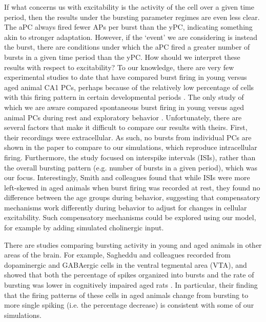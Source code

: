 \documentclass[10pt,letterpaper]{article}
\begin{document}
 If what concerns us with excitability is the activity of the cell over a given time period, then the results under the bursting parameter regimes are even less clear. The aPC always fired fewer APs per burst than the yPC, indicating something akin to stronger adaptation. However, if the `event' we are considering is instead the burst, there are conditions under which the aPC fired a greater number of bursts in a given time period than the yPC. How should we interpret these results with respect to excitability? To our knowledge, there are very few experimental studies to date that have compared burst firing in young versus aged animal CA1 PCs, perhaps because of the relatively low percentage of cells with this firing pattern in certain developmental periods \cite{chen2005transitional}. The only study of which we are aware compared spontaneous burst firing in young versus aged animal PCs during rest and exploratory behavior \cite{smith2000effect}. Unfortunately, there are several factors that make it difficult to compare our results with theirs. First, their recordings were extracellular. As such, no bursts from individual PCs are shown in the paper to compare to our simulations, which reproduce intracellular firing. Furthermore, the study focused on interspike intervals (ISIs), rather than the overall bursting pattern (e.g. number of bursts in a given period), which was our focus. Interestingly, Smith and colleagues \cite{smith2000effect} found that while ISIs were more left-skewed in aged animals when burst firing was recorded at rest, they found no difference between the age groups during behavior, suggesting that compensatory mechanisms work differently during behavior to adjust for changes in cellular excitability. Such compensatory mechanisms could be explored using our model, for example by adding simulated cholinergic input. 
 
There are studies comparing bursting activity in young and aged animals in other areas of the brain. For example, Sagheddu and colleagues recorded from dopaminergic and GABAergic cells in the ventral tegmental area (VTA), and showed that both the percentage of spikes organized into bursts and the rate of bursting was lower in cognitively impaired aged rats \cite{sagheddu2024cognitive}. In particular, their finding that the firing patterns of these cells in aged animals change from bursting to more single spiking (i.e. the percentage decrease) is consistent with some of our simulations.
 
\end{document}
